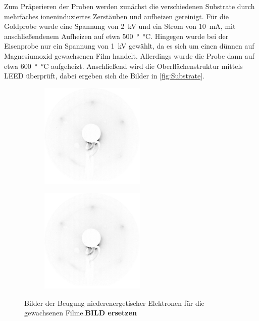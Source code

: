         Zum Präperieren der Proben werden zunächst die verschiedenen Substrate durch mehrfaches ioneninduziertes Zerstäuben und aufheizen gereinigt.
        Für die Goldprobe wurde eine Spannung von \SI{2}{\kilo\volt} und ein Strom von \SI{10}{\milli\ampere}, mit anschließendenem Aufheizen auf etwa \SI{500}{\degree\celsius}.
        Hingegen wurde bei der Eisenprobe nur ein Spannung von \SI{1}{\kilo\volt} gewählt, da es sich um einen dünnen auf Magnesiumoxid gewachsenen Film handelt.
        Allerdings wurde die Probe dann auf etwa \SI{600}{\degree\celsius} aufgeheizt.
        Anschließend wird die Oberflächenstruktur mittels LEED überprüft, dabei ergeben sich die Bilder in \autoref{fig:Substrate}.

        \begin{figure}
            \centering
            \begin{subfigure}{0.48\textwidth}
                \centering
                \includegraphics[height=5cm]{./content/2021_06_15_019_NiO(111)_73eV_Thicklayer}
            \end{subfigure}
            \begin{subfigure}{0.48\textwidth}
                \centering
                \includegraphics[height=5cm]{./content/2021_06_15_019_NiO(111)_73eV_Thicklayer}
            \end{subfigure}
            \caption{Bilder der Beugung niederenergetischer Elektronen für die gewachsenen Filme.\textbf{BILD ersetzen}}
        \label{fig:Filme}
        \end{figure}
